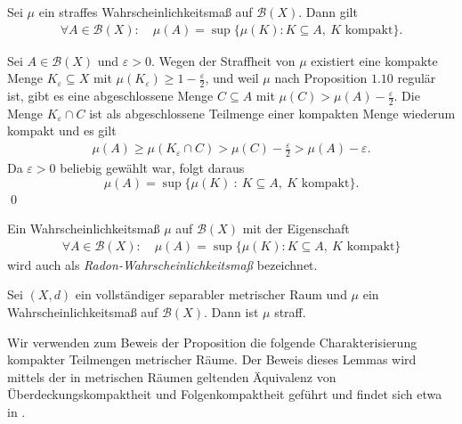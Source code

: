 \begin{corollary}
    Sei $\mu$ ein straffes Wahrscheinlichkeitsmaß auf $\mathcal{B}(X)$. Dann gilt
    \begin{align*}
        \forall A \in \mathcal{B}(X): \quad \mu(A) = \sup\{\mu(K): K \subseteq A,\ K \text{ kompakt}\}. 
    \end{align*}
\end{corollary}

\begin{proof*}
    Sei $A \in \mathcal{B}(X)$ und $\varepsilon > 0$. Wegen der Straffheit von $\mu$ existiert eine kompakte Menge $K_{\varepsilon} \subseteq X$ mit $\mu(K_{\varepsilon}) \geq 1 - \frac{\varepsilon}{2}$,
    und weil $\mu$ nach Proposition $1.10$ regulär ist, gibt es eine abgeschlossene Menge $C \subseteq A$ mit $\mu(C) > \mu(A) - \frac{\varepsilon}{2}$. 
    Die Menge $K_{\varepsilon} \cap C$ ist als abgeschlossene Teilmenge einer kompakten Menge wiederum kompakt und es gilt
    \begin{align*}
        \mu(A) \geq \mu(K_{\varepsilon} \cap C) > \mu(C) - \frac{\varepsilon}{2} > \mu(A) - \varepsilon. 
    \end{align*} 
    Da $\varepsilon > 0$ beliebig gewählt war, folgt daraus 
    $$
        \mu(A) = \sup\{\mu(K) \ : \ K \subseteq A, \ K \text{ kompakt} \}. 
    $$\qed
\end{proof*}

\begin{remark}
    Ein Wahrscheinlichkeitsmaß $\mu$ auf $\mathcal{B}(X)$ mit der Eigenschaft
    \begin{align*}
        \forall A \in \mathcal{B}(X): \quad \mu(A) = \sup\{\mu(K): K \subseteq A, \ K \text{ kompakt}\}
    \end{align*}
    wird auch als \textit{Radon-Wahrscheinlichkeitsmaß} bezeichnet.
\end{remark}

\begin{proposition}
    Sei $(X,d)$ ein vollständiger separabler metrischer Raum und $\mu$ ein Wahrscheinlichkeitsmaß auf $\mathcal{B}(X)$. Dann ist $\mu$ straff.
\end{proposition}

Wir verwenden zum Beweis der Proposition die folgende Charakterisierung kompakter Teilmengen metrischer Räume. 
Der Beweis dieses Lemmas wird mittels der in metrischen Räumen geltenden Äquivalenz von Überdeckungskompaktheit und Folgenkompaktheit geführt und findet sich etwa in \cite[Theorem III.3.10]{amann}. 

